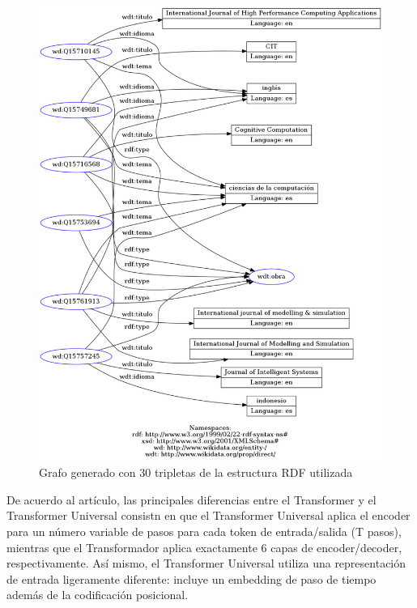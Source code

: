 \documentclass[conference]{IEEEtran}
\begin{document}
\begin{figure}[H]
\includegraphics[scale=0.25]{imagenes/grafo_rdf_30.jpeg} 
\caption{Grafo generado con 30 tripletas de la estructura RDF utilizada \cite{b2}}
\end{figure} 

\vspace{0.2cm}

De acuerdo al art\'iculo, las principales diferencias entre el Transformer y el Transformer Universal consistn en que el Transformer Universal aplica el encoder para un n\'umero variable de pasos para cada token de entrada/salida (T pasos), mientras que el Transformador aplica exactamente $6$ capas de encoder/decoder, respectivamente. As\'i mismo, el Transformer Universal utiliza una representaci\'on de entrada ligeramente diferente: incluye un embedding de paso de tiempo adem\'as de la codificaci\'on posicional.

\vspace{0.2cm}
\end{document}
